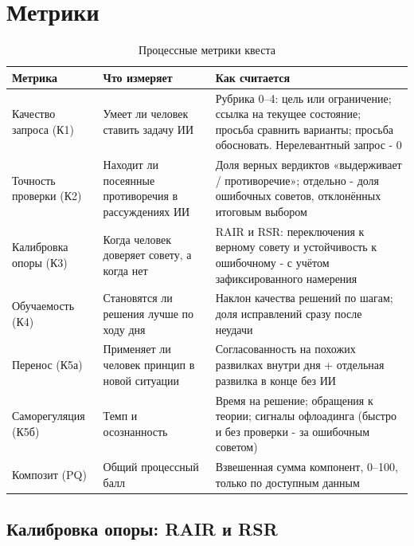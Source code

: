 \documentclass[12pt,a4paper]{article}
\begin{document}
\section{Метрики}

\begin{table}[htbp]
\centering
\footnotesize
\setlength{\tabcolsep}{3pt}
\renewcommand{\arraystretch}{1.25}
\caption{Процессные метрики квеста}
\label{tab:metrics}
\begin{tabularx}{\textwidth}{@{}L{0.2\textwidth} Y Y@{}}
\toprule
\textbf{Метрика} &
\textbf{Что измеряет} &
\textbf{Как считается} \\
\midrule

Качество запроса (К1) &
Умеет ли человек ставить задачу ИИ &
Рубрика 0--4: цель или ограничение; ссылка на текущее состояние; просьба сравнить варианты; просьба обосновать. Нерелевантный запрос - 0 \\

Точность проверки (К2) &
Находит ли посеянные противоречия в рассуждениях ИИ &
Доля верных вердиктов «выдерживает / противоречие»; отдельно - доля ошибочных советов, отклонённых итоговым выбором \\

Калибровка опоры (К3) &
Когда человек доверяет совету, а когда нет &
RAIR и RSR: переключения к верному совету и устойчивость к ошибочному - с учётом зафиксированного намерения \\

Обучаемость (К4) &
Становятся ли решения лучше по ходу дня &
Наклон качества решений по шагам; доля исправлений сразу после неудачи \\ 

Перенос (К5а) &
Применяет ли человек принцип в новой ситуации &
Согласованность на похожих развилках внутри дня + отдельная развилка в конце без ИИ \\

Саморегуляция (К5б) &
Темп и осознанность &
Время на решение; обращения к теории; сигналы офлоадинга (быстро и без проверки - за ошибочным советом)  \\ 

\midrule
Композит (PQ) &
Общий процессный балл &
Взвешенная сумма компонент, 0--100, только по доступным данным \\
\bottomrule
\end{tabularx}
\end{table}

\subsection{Калибровка опоры: RAIR и RSR}
\end{document}
